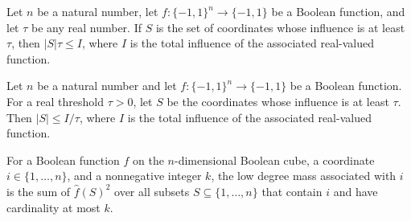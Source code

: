 \begin{theorem}
\label{FABL.card_influentialCoordinates_mul_le_totalInfluence}
\leanok
{}
Let $n$ be a natural number, let $f:\{-1,1\}^n\to\{-1,1\}$ be a Boolean function,
and let $\tau$ be any real number. If $S$ is the set of coordinates whose influence is
at least $\tau$, then $|S|\tau\leq I$, where $I$ is the total influence of the
associated real-valued function.
\end{theorem}

\begin{theorem}
\label{FABL.card_influentialCoordinates_le_div}
\leanok
{}
Let $n$ be a natural number and let $f:\{-1,1\}^n\to\{-1,1\}$ be a Boolean
function. For a real threshold $\tau>0$, let $S$ be the coordinates whose influence is
at least $\tau$. Then $|S|\leq I/\tau$, where $I$ is the total influence of the
associated real-valued function.
\end{theorem}

\begin{definition}
\label{FABL.lowDegreeCoordinateMass}
\leanok
{}
For a Boolean function $f$ on the $n$-dimensional Boolean cube, a coordinate
$i\in\{1,\ldots,n\}$, and a nonnegative integer $k$, the low degree mass associated with
$i$ is the sum of $\widehat f(S)^2$ over all subsets $S\subseteq\{1,\ldots,n\}$ that
contain $i$ and have cardinality at most $k$.
\end{definition}

